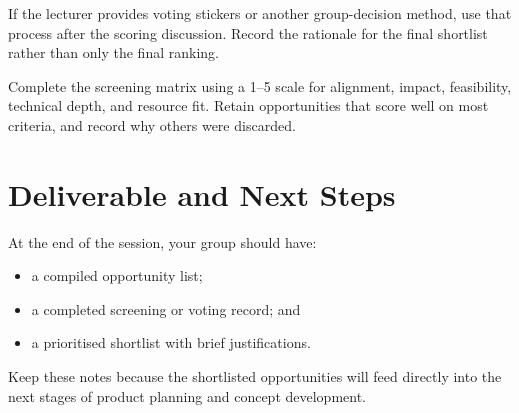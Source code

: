 If the lecturer provides voting stickers or another group-decision method, use that process after the scoring discussion. Record the rationale for the final shortlist rather than only the final ranking.

\begin{tcolorbox}[title=Checkpoint]
Complete the screening matrix using a 1--5 scale for alignment, impact, feasibility, technical depth, and resource fit. Retain opportunities that score well on most criteria, and record why others were discarded.
\end{tcolorbox}

\section{Deliverable and Next Steps}

At the end of the session, your group should have:
\begin{itemize}
    \item a compiled opportunity list;
    \item a completed screening or voting record; and
    \item a prioritised shortlist with brief justifications.
\end{itemize}

Keep these notes because the shortlisted opportunities will feed directly into the next stages of product planning and concept development.
